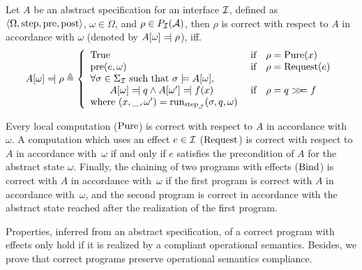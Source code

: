 \begin{definition} \label{def:freespec:correctness} Let $A$ be an abstract
  specification for an interface $\mathcal{I}$, defined as
  $\langle \Omega, \mathrm{step}, \mathrm{pre}, \mathrm{post} \rangle$,
  $\omega \in \Omega$, and $\rho \in P_{\mathcal{I}}(\mathcal{A})$, then $\rho$ is
  correct with respect to $A$ in accordance with $\omega$ (denoted by
  $A[\omega] \modelssym \rho$), iff.
  \[
    A[\omega] \mathrel{\reflectbox{$\models$}} \rho \triangleq \left\{
      \begin{array}{lcl}
        \text{True} & \text{ if} & \rho = \func{Pure}(x) \\
        \func{pre}(e, \omega) & \text{ if} & \rho = \func{Request}(e) \\
        \forall \sigma \in \Sigma_{\I} \text{ such that } \sigma \models
        A[\omega], & & \\
        \qquad A[\omega] \modelssym q \wedge A[\omega'] \modelssym f(x) & \text{
                                                                          if} & \rho = q \bind f \\
        \text{where }(x, \_, \omega') =
        \func{run}_{\func{step}_{\J}}(\sigma, q, \omega) & \\
      \end{array}
    \right.
  \]
\end{definition}

Every local computation ($\mathrm{Pure}$) is correct with respect to $A$ in
accordance with~$\omega$.
%
A computation which uses an effect $e \in \mathcal{I}$ ($\mathrm{Request}$) is correct with
respect to $A$ in accordance with~$\omega$ if and only if $e$ satisfies the
precondition of $A$ for the abstract state $\omega$.
%
Finally, the chaining of two programs with effects ($\mathrm{Bind}$) is correct
with $A$ in accordance with~$\omega$ if the first program is correct with $A$ in
accordance with~$\omega$, and the second program is correct in accordance with
the abstract state reached after the realization of the first program.

Properties, inferred from an abstract specification, of a correct program with
effects only hold if it is realized by a compliant operational semantics.
%
Besides, we prove that correct programs preserve operational semantics
compliance.

